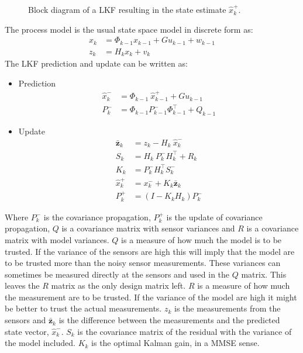 \begin{figure}
	\centering
	
	\caption{Block diagram of a \acl{LKF} resulting in the state estimate $\hat x_k^+$.}
	\label{fig:blockkf}
\end{figure}

The process model is the usual state space model in discrete form as:
\begin{align}
x_k &= \Phi_{k-1} x_{k-1} + G u_{k-1} + w_{k-1}\\
z_k &= H_k x_k + v_k
\end{align}
\noindent The \ac{LKF} prediction and update can be written as:
\begin{itemize}\tightlist
\item Prediction
\begin{align}
\hat x_k^- &= \Phi_{k-1}\ \hat x_{k-1}^+ + G u_{k-1} \\
P_k^- &= \Phi_{k-1}P_{k-1}^- \Phi_{k-1}^\top + Q_{k-1}
\end{align}
\item Update
\begin{align}
\bar{\mathbf{z}}_k &= z_k - H_k\ \hat x_k^-\\
S_k &= H_k\ P_k^-H_k^\top + R_k\\
K_k &= P_k^-H_k^\top S_k^-\\
\hat x_k^+ &= x_k^- + K_k \bar{\mathbf{z}}_k\\
P_k^+ &= (I - K_k H_k) P_k^-
\end{align}
\end{itemize}
Where $P_{k}^-$ is the covariance propagation, $P_{k}^+$ is the update of covariance propagation, $Q$ is a covariance matrix with sensor variances and $R$ is a covariance matrix with model variances. $Q$ is a measure of how much the model is to be trusted. If the variance of the sensors are high this will imply that the model are to be trusted more than the noisy sensor measurements. These variances can sometimes be measured directly at the sensors and used in the $Q$ matrix. This leaves the $R$ matrix as the only design matrix left. $R$ is a measure of how much the measurement are to be trusted. If the variance of the model are high it might be better to trust the actual measurements. $z_k$ is the measurements from the sensors and $\bar{\mathbf{z}}_k$ is the difference between the measurements and the predicted state vector, $\hat x_k^-$. $S_k$ is the covariance matrix of the residual with the variance of the model included. $K_k$ is the optimal Kalman gain, in a \ac{MMSE} sense. 

